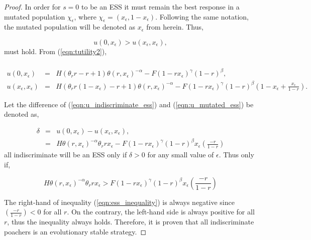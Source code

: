 \documentclass[10pt]{article}
\begin{document}
\begin{proof}
    In order for \(s=0\) to be an ESS it must
    remain the best response in a mutated population \(\chi_\epsilon\),
    where \(\chi_{\epsilon}=(x_\epsilon, 1 - x_\epsilon)\). Following the same
    notation, the mutated population will be denoted as \(x_\epsilon\) from
    herein. Thus,

    \begin{equation}\label{eqn:evolutionary_stability}
        u(0, x_\epsilon) > u(x_\epsilon, x_\epsilon),
    \end{equation}
    must hold. From (\ref{eqn:tutility2}),

    \begin{eqnarray}
        \label{eqn:u_indiscriminate_ess}
        \\u(0, x_\epsilon)  &=& H(\theta_rr - r + 1)\theta(r, x_\epsilon) ^{-\alpha}
        - F(1 - rx_\epsilon) ^ {\gamma} (1- r) ^ {\beta}, 
        \\
        \label{eqn:u_mutated_ess}
         u(x_\epsilon, x_\epsilon) &=& H(\theta_rr(1 - x_\epsilon)-r+ 1)\theta(r,
        x_\epsilon) ^{-\alpha} - F(1 - rx_\epsilon) ^ {\gamma} (1- r) ^
        {\beta}\left(1 - 
        x_\epsilon + \frac{x_\epsilon}{1- r}\right).
\end{eqnarray}

    Let the difference of (\ref{eqn:u_indiscriminate_ess}) and (\ref{eqn:u_mutated_ess})
    be denoted as,

    \begin{eqnarray}
        \label{eqn:delta}
        \delta &=& u(0, x_\epsilon) - u(x_\epsilon, x_\epsilon),
          \\
         &=& H\theta(r,  x_\epsilon) ^{-\alpha} \theta_r r x_\epsilon -
        F(1 - r x_\epsilon) ^ {\gamma} (1- r) ^
        {\beta}x_\epsilon\left(\frac{-r}{1- r}\right)
    \end{eqnarray}
    all indiscriminate will be an ESS only if \(\delta >0 \) for any small
    value of \(\epsilon\). Thus only if,

    \begin{equation}
    \label{eqn:ess_inequality}
        H\theta(r, x_\epsilon) ^{-\alpha} \theta_r r x_\epsilon > F
        (1 - r x_\epsilon) ^ {\gamma} (1- r) ^ {\beta}
        x_\epsilon\left(\frac{-r}{1- r}\right)
    \end{equation}

    The right-hand of inequality (\ref{eqn:ess_inequality}) is always negative
    since \((\frac{-r}{1- r}) < 0\)  for all \(r\). On the contrary, the left-hand
    side is always positive for all \(r\), thus the inequality always holds.
    Therefore, it is proven that all indiscriminate poachers is an evolutionary
    stable strategy.
\end{proof}
\end{document}
